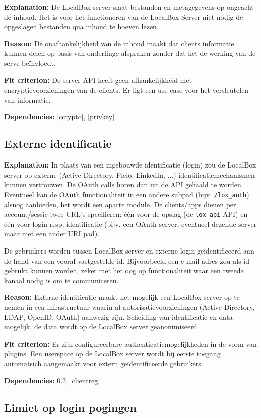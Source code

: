 \documentclass[[11pt,a4paper]{article}
\newcommand\requirement[2]{\subsection{#2}\label{#1}}
\newcommand\explanation{\noindent\textbf{Explanation: }}
\newcommand\reason{\noindent\textbf{Reason: }}
\newcommand\criterion{\noindent\textbf{Fit criterion: }}
\newcommand\dependencies{\noindent\textbf{Dependencies: }}
\begin{document}
    \explanation De LocalBox server slaat bestanden en metagegevens op ongeacht de inhoud. Het is voor het functioneren van de LocalBox Server niet nodig de opgeslagen bestanden qua inhoud te hoeven lezen.

    \reason De onafhankelijkheid van de inhoud maakt dat clients informatie kunnen delen op basis van onderlinge afspraken zonder dat het de werking van de serve be\"{i}nvloedt.
        
    \criterion De server API heeft geen afhankelijkheid met encryptievoorzieningen van de clients. Er ligt een use case voor het versleutelen van informatie.
        
    \dependencies \ref{ccrypto}, \ref{privkey}


\requirement{saml}{Externe identificatie}

    \explanation In plaats van een ingebouwde identificatie (login) zou de LocalBox server op externe (Active Directory, Pleio, LinkedIn, ...) identificatiemechanismen kunnen vertrouwen. De OAuth calls horen dan uit de API gehaald te worden. Eventueel kan de OAuth functionaliteit in een andere subpad (bijv. \texttt{/lox\_auth}) alsnog aanbieden, het wordt een aparte module. De clients/apps dienen per account/sessie twee URL's specifieren: \'{e}\'{e}n voor de opslag (de \texttt{lox\_api} API) en \'{e}\'{e}n voor login resp. identificatie (bijv. een OAuth server, eventueel dezelfde server maar met een ander URI pad). 
    
    De gebruikers worden tussen LocalBox server en externe login ge\"identificeerd aan de hand van een vooraf vastgestelde id. Bijvoorbeeld een e-mail adres zou als id gebrukt kunnen worden, zeker met het oog op functionaliteit waar een tweede kanaal nodig is om te communiceren.

    \reason Externe identificatie maakt het mogelijk een LocalBox server op te nemen in een infrastructuur waarin al autorisatievoorzieningen (Active Directory, LDAP, OpenID, OAuth) aanwezig zijn. Scheiding van identificatie en data mogelijk, de data wordt op de LocalBox server geanonimiseerd

    \criterion Er zijn configureerbare authenticatiemogelijkheden in de vorm van plugins. Een userspace op de LocalBox server wordt bij eerste toegang automatsich aangemaakt voor extern ge\"{i}dentificeerde gebruikers. 

    \dependencies \ref{authlimit}, \ref{clientreg}


\requirement{authlimit}{Limiet op login pogingen}
\end{document}
